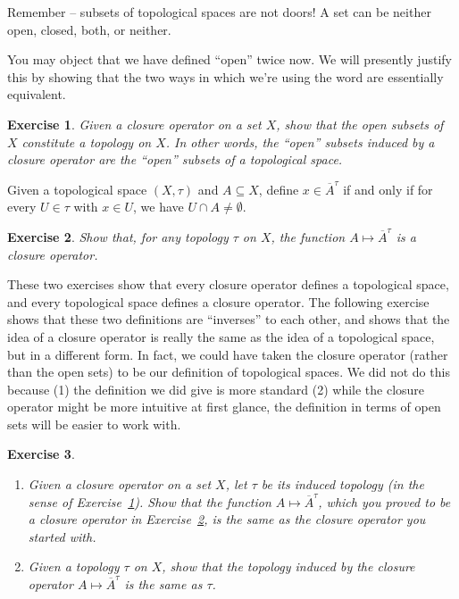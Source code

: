\documentclass[12pt]{amsart}
\newtheorem{exercise}{Exercise}[section]
\theoremstyle{definition}
\theoremstyle{remark}
\newcommand{\0}{\emptyset}
\newcommand{\closure}[1]{\overline{#1}}
\begin{document}
Remember -- subsets of topological spaces are not doors! A set can be neither open, closed, both, or neither.

You may object that we have defined ``open'' twice now. We will presently justify this by showing that the two ways in which we're using the word are essentially equivalent.

\begin{exercise}\label{ex:closureoperatortotopology}
Given a closure operator on a set $X$, show that the open subsets of $X$ constitute a topology on $X$. In other words, the ``open'' subsets induced by a closure operator are the ``open'' subsets of a topological space.
\end{exercise}

Given a topological space $(X,\tau)$ and $A \subseteq X$, define $x \in \closure{A}^\tau$ if and only if for every $U \in \tau$ with $x \in U$, we have $U \cap A \neq \0$.

\begin{exercise}\label{ex:topologytoclosureoperator}
Show that, for any topology $\tau$ on $X$, the function $A \mapsto \closure{A}^\tau$ is a closure operator.
\end{exercise}

These two exercises show that every closure operator defines a topological space, and every topological space defines a closure operator. The following exercise shows that these two definitions are ``inverses'' to each other, and shows that the idea of a closure operator is really the same as the idea of a topological space, but in a different form. In fact, we could have taken the closure operator (rather than the open sets) to be our definition of topological spaces. We did not do this because (1) the definition we did give is more standard (2) while the closure operator might be more intuitive at first glance, the definition in terms of open sets will be easier to work with.

\begin{exercise}
\begin{enumerate}
\item Given a closure operator on a set $X$, let $\tau$ be its induced topology (in the sense of Exercise~\ref{ex:closureoperatortotopology}). Show that the function $A \mapsto \closure{A}^\tau$, which you proved to be a closure operator in Exercise~\ref{ex:topologytoclosureoperator}, is the same as the closure operator you started with.
\item Given a topology $\tau$ on $X$, show that the topology induced by the closure operator $A \mapsto \closure{A}^\tau$ is the same as $\tau$.
\end{enumerate}
\end{exercise}
\end{document}
